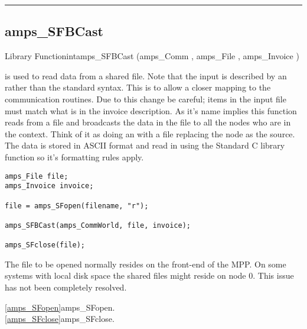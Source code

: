 \noindent\rule{\textwidth}{1mm}

\subsection{amps\_SFBCast}
\label{amps_SFBCast}


\begin{deftypefn}{Library Function}{int}{amps\_SFBCast}
(amps_Comm  , amps_File  , amps_Invoice )

\DESCRIPTION

 is used to read data from a shared file.  Note
that the input is described by an  rather than the
standard  syntax.  This is to allow a closer mapping to
the communication routines.  Due to this change be careful; items in
the input file must match what is in the invoice description.  As it's
name implies this function reads from a file and broadcasts the data
in the file to all the nodes who are in the  context.  Think
of it as doing an  with a file replacing the node as
the source.  The data is stored in ASCII format and read in using
the Standard C library function  so it's formatting rules
apply.

\EXAMPLE
\begin{display}\begin{verbatim}
amps_File file;
amps_Invoice invoice;

file = amps_SFopen(filename, "r");

amps_SFBCast(amps_CommWorld, file, invoice);

amps_SFclose(file);
\end{verbatim}\end{display}

\NOTES
The file to be opened normally resides on the front-end of the MPP.  On
some systems with local disk space the shared files might reside on node
0.  This issue has not been completely resolved.

\SEEALSO
\vref{amps_SFopen}{amps\_SFopen}. \\
\vref{amps_SFclose}{amps\_SFclose}. \\

\end{deftypefn}

